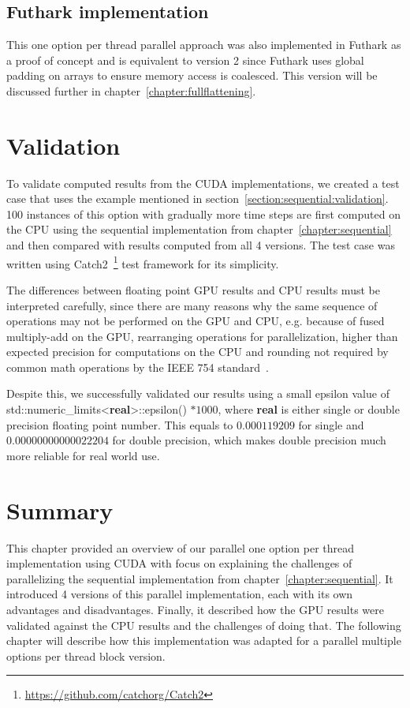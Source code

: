 \subsection*{Futhark implementation}
This one option per thread parallel approach was also implemented in Futhark as a proof of concept and is equivalent to version 2 since Futhark uses global padding on arrays to ensure memory access is coalesced. This version will be discussed further in chapter~\ref{chapter:fullflattening}.

\section{Validation}\label{section:option:validation}
To validate computed results from the CUDA implementations, we created a test case that uses the example mentioned in section~\ref{section:sequential:validation}. 100 instances of this option with gradually more time steps are first computed on the CPU using the sequential implementation from chapter~\ref{chapter:sequential} and then compared with results computed from all 4 versions. The test case was written using Catch2~\footnote{\url{https://github.com/catchorg/Catch2}} test framework for its simplicity.

The differences between floating point GPU results and CPU results must be interpreted carefully, since there are many reasons why the same sequence of operations may not be performed on the GPU and CPU, e.g. because of fused multiply-add on the GPU, rearranging operations for parallelization, higher than expected precision for computations on the CPU and rounding not required by common math operations by the IEEE 754 standard~\cite[pg. 16]{whitehead2018}.

Despite this, we successfully validated our results using a small epsilon value of std::numeric\_limits<\textbf{real}>::epsilon() $* 1000$,
where \textbf{real} is either single or double precision floating point number. This equals to $0.000119209$ for single and $0.00000000000022204$ for double precision, which makes double precision much more reliable for real world use.

\section*{Summary}
This chapter provided an overview of our parallel one option per thread implementation using CUDA with focus on explaining the challenges of parallelizing the sequential implementation from chapter~\ref{chapter:sequential}. It introduced 4 versions of this parallel implementation, each with its own advantages and disadvantages. Finally, it described how the GPU results were validated against the CPU results and the challenges of doing that. 
The following chapter will describe how this implementation was adapted for a parallel multiple options per thread block version.
